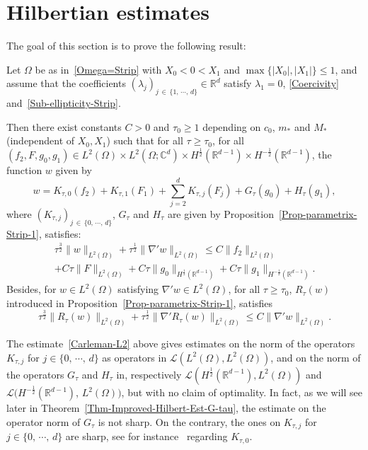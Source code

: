 \documentclass[AHL,Unicode,longabstracts]{cedram}
\newcommand{\scL}{\mathscr{L}}
\newcommand*\R{\mathbb{R}}
\newcommand*\C{\mathbb{C}}
\renewcommand{\leq}{\leqslant}
\renewcommand{\geq}{\geqslant}
\begin{document}
\section{Hilbertian estimates}\label{Sec-Hilbertian-est}

The goal of this section is to prove the following result:

\begin{theo}\label{Thm-Hilbertian-est}
Let $\Omega$ be as in~\eqref{Omega=Strip} with $X_0 \! <\! 0\! <\! X_1$ and $\max\{|X_0|, |X_1|\} \leq 1$, and assume that the coefficients $(\lambda_j)_{j\,\in\,\{1,\,\cdots,\,d\}} \in \R^d$ satisfy $\lambda_1 = 0$, \eqref{Coercivity} and~\eqref{Sub-ellipticity-Strip}.

Then there exist constants $C>0$ and $\tau_0 \geq 1$ depending on $c_0$, $m_*$ and $M_*$ (independent of $X_0, X_1$) such that for all $\tau \geq \tau_0$, for all $(f_2,F,g_0, g_1) \in L^2(\Omega) \times L^2(\Omega; \C^d) \times H^{\frac{1}{2}}(\R^{d-1})\times H^{-\frac{1}{2}}(\R^{d-1})$, the function $w$ given by
\begin{equation}\label{parametrix-f2_*=0}
w = K_{\tau,0} (f_2) + K_{\tau,1}(F_1) + \sum_{j = 2}^d K_{\tau,j} (F_j) + G_\tau(g_0) + H_\tau(g_1),
\end{equation}
where $(K_{\tau,j})_{j\,\in\,\{0,\,\cdots,\,d\} }$, $G_\tau$ and $H_\tau$ are given by Proposition~\ref{Prop-parametrix-Strip-1}, satisfies:
\begin{multline}\label{Carleman-L2}
\tau^{\frac{3}{2}} \| w \|_{L^2(\Omega)} + \tau^{\frac{1}{2}} \| \nabla' w \|_{L^2(\Omega)}
\leq C \| f_2 \|_{L^2(\Omega)}
\\
+ C\tau \| F\|_{L^2(\Omega)} + C \tau \| g_0 \|_{H^{\frac{1}{2}}\left(\R^{d-1}\right)} + C\tau \| g_1\|_{H^{-\frac{1}{2}}\left(\R^{d-1}\right)}.
\end{multline}
Besides, for $w \in L^2(\Omega)$ satisfying $\nabla' w \in L^2(\Omega)$, for all $\tau \geq \tau_0$, $R_\tau (w)$ introduced in Proposition~\ref{Prop-parametrix-Strip-1}, satisfies
\begin{equation}\label{Est-R-tau-L2}
\tau^{\frac{3}{2}} \| R_\tau (w) \|_{L^2(\Omega)} + \tau^{\frac{1}{2}} \| \nabla' R_\tau (w) \|_{L^2(\Omega)}
\leq C \| \nabla' w \|_{L^2(\Omega)}.
\end{equation}
\end{theo}

\begin{rema}
The estimate~\eqref{Carleman-L2} above gives estimates on the norm of the operators $K_{\tau,j}$ for $j \in \{0,\, \cdots,\,d\}$ as operators in $\scL(L^2(\Omega), L^2(\Omega))$, and on the norm of the operators $G_{\tau}$ and $H_\tau$ in, respectively $\scL(H^{\frac{1}{2}}(\R^{d-1}), L^2(\Omega))$ and $\scL(H^{-\frac{1}{2}}(\R^{d-1})$, $ L^2(\Omega))$, but with no claim of optimality. In fact, as we will see later in Theorem~\ref{Thm-Improved-Hilbert-Est-G-tau}, the estimate on the operator norm of $G_\tau$ is not sharp. On the contrary, the ones on $K_{\tau,j}$ for $j \in \{0,\,\cdots,\,d\}$ are sharp, see for instance~\cite[Part~1, Theorems~4.4, 4.5 and Theorem~4.10]{LeRousseaubookvolume1} regarding $K_{\tau,0}$.
\end{rema}
\end{document}
